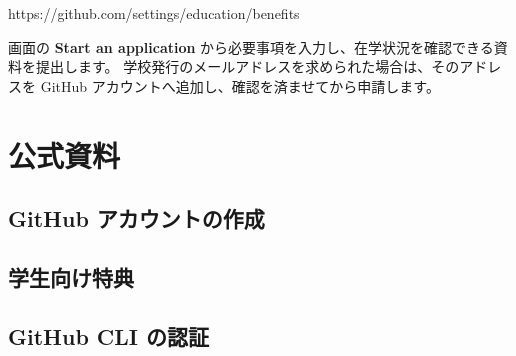 \documentclass[a4paper]{jlreq}
\newcommand{\term}[1]{\textbf{#1}}
\begin{document}
\begin{codeblock}
https://github.com/settings/education/benefits
\end{codeblock}

画面の \term{Start an application} から必要事項を入力し、在学状況を確認できる資料を提出します。
学校発行のメールアドレスを求められた場合は、そのアドレスを GitHub アカウントへ追加し、確認を済ませてから申請します\cite{github-education-apply}。

\section{公式資料}

\begingroup
\footnotesize

\subsection{GitHub アカウントの作成}

\printbibliography[heading=none,keyword=account]

\subsection{学生向け特典}

\printbibliography[heading=none,keyword=education]

\subsection{GitHub CLI の認証}

\printbibliography[heading=none,keyword=cli]

\endgroup
\end{document}
